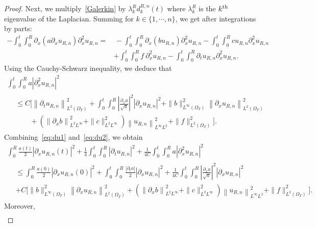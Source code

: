 \documentclass[AHL,Unicode,longabstracts,published]{cedram}
\begin{document}
\begin{proof}
Next, we multiply~\eqref{Galerkin} by $\lambda^R_k d^{R,n}_k(t)$ where $\lambda^R_k$ is the $k^{\rm th}$ eigenvalue of the Laplacian. Summing for $k\in \{1,\cdots, n\}$, we get after integrations by parts:
\begin{align*}
- \int_0^t \int_0^R \partial_x(a\partial_x u_{R,n}) \partial^2_x u_{R,n}  =&\, - \int_0^t \int_0^R \partial_x(bu_{R,n}) \partial^2_x u_{R,n} - \int_0^t\int_0^Rcu_{R,n} \partial^2_x u_{R,n} \\
& + \int_0^t\int_0^R f \ \partial^2_x u_{R,n} - \int_0^t\int_0^R \partial_t u_{R,n} \partial^2_x u_{R,n}. 
\end{align*}
Using the Cauchy-Schwarz inequality, we deduce that
\begin{multline}\label{eq:du2}
\int_0^t \int_0^R a \left|\partial^2_x u_{R,n}\right|^2 \\
\begin{aligned}
& \leq {C} \Big[\left\|\partial_t u_{R,n}\right\|_{L^2(\Omega_T)}^2 + \int_0^t\int_0^R \left|\frac{\partial_x a}{\sqrt{a}}\right|^2 \left|\partial_x u_{R,n}\right|^2 + \|b\|_{L^\infty(\Omega_T)}^2 \left\|\partial_x u_{R,n}\right\|_{L^2(\Omega_T)}^2 \\
& \qquad +\left(\left\|\partial_x b\right\|_{L^2 L^\infty}^2 + \|c\|_{L^2 L^\infty}^2\right) \left\|u_{R,n}\right\|_{L^\infty L^2}^2 + \|f\|_{L^2(\Omega_T)}^2
\Big].
\end{aligned}
\end{multline}
Combining~\eqref{eq:du1} and~\eqref{eq:du2}, we obtain
\begin{multline*}
 \int_0^R \frac{a(t)}{2} \left|\partial_x u_{R,n}(t)\right|^2 + \frac{1}{4} \int_0^t \int_0^R \left|\partial_t u_{R,n}\right|^2 + \frac{1}{4{C}}\int_0^t \int_0^R a \left|\partial^2_x u_{R,n}\right|^2  \\
\begin{aligned}
&\leq \int_0^R \frac{a(0)}{2} \left|\partial_x u_{R,n}(0)\right|^2 + \int_0^t \int_0^R \frac{|\partial_t a|}{2} \left|\partial_x u_{R,n}\right|^2 + \frac{1}{4{C}}\int_0^t\int_0^R \left|\frac{\partial_x a}{\sqrt{a}}\right|^2 \left|\partial_x u_{R,n}\right|^2 \\
&+ C \Big[
\|b\|_{L^\infty(\Omega_T)}^2 \left\|\partial_x u_{R,n}\right\|_{L^2(\Omega_T)}^2 +\left(\left\|\partial_x b\right\|_{L^2 L^\infty}^2 + \|c\|_{L^2 L^\infty}^2\right) \left\|u_{R,n}\right\|_{L^\infty L^2}^2 + \|f\|_{L^2(\Omega_T)}^2 \Big].
\end{aligned}
\end{multline*}
Moreover,
\begin{align*}

\end{align*}
\end{proof}
\end{document}
